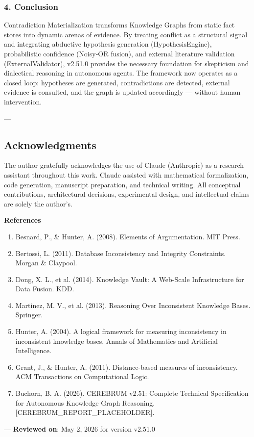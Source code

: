\subsubsection{4. Conclusion}
Contra\-diction Materi\-alization transforms Knowledge Graphs from static fact stores into dynamic arenas of evidence. By treating conflict as a structural signal and integrating abductive hypothesis generation (HypothesisEngine), proba\-bilistic confidence (Noisy-OR fusion), and external literature validation (ExternalValidator), v2.51.0 provides the necessary foundation for skepticism and dialectical reasoning in autonomous agents. The framework now operates as a closed loop: hypotheses are generated, contr\-adictions are detected, external evidence is consulted, and the graph is updated accordingly — without human inter\-vention.

---
\subsection{Acknow\-ledgments}

The author gratefully ackno\-wledges the use of Claude (Anthropic) as a research assistant throughout this work. Claude assisted with mathe\-matical forma\-lization, code generation, manuscript preparation, and technical writing. All conceptual contr\-ibutions, archi\-tectural decisions, exper\-imental design, and intel\-lectual claims are solely the author's.

\textbf{References}
\begin{enumerate}
\item Besnard, P., \& Hunter, A. (2008). Elements of Argume\-ntation. MIT Press.
\item Bertossi, L. (2011). Database Incons\-istency and Integrity Constraints. Morgan \& Claypool.
\item Dong, X. L., et al. (2014). Knowledge Vault: A Web-Scale Infras\-tructure for Data Fusion. KDD.
\item Martinez, M. V., et al. (2013). Reasoning Over Incons\-istent Knowledge Bases. Springer.
\item Hunter, A. (2004). A logical framework for measuring incon\-sistency in incon\-sistent knowledge bases. Annals of Mathematics and Artificial Intell\-igence.
\item Grant, J., \& Hunter, A. (2011). Distance-based measures of incon\-sistency. ACM Transa\-ctions on Comput\-ational Logic.
\item Buchorn, B. A. (2026). CEREBRUM v2.51: Complete Technical Specif\-ication for Autonomous Knowledge Graph Reasoning. [CEREBRUM\_REPORT\_PLACEHOLDER].

\end{enumerate}
---
\textbf{Reviewed on}: May 2, 2026 for version v2.51.0
